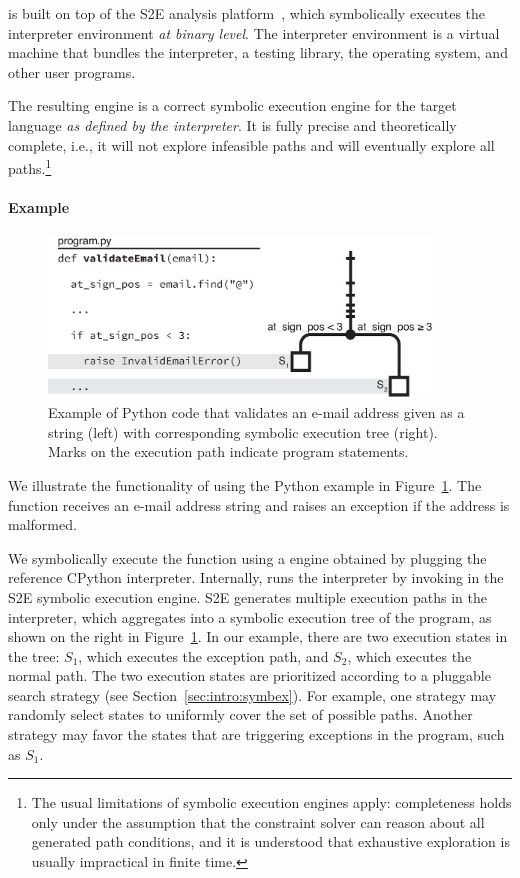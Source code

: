 \chef is built on top of the S2E analysis platform~\cite{s2eSystem}, which symbolically executes the interpreter environment \emph{at binary level}.
%
The interpreter environment is a virtual machine that bundles the interpreter, a testing library, the operating system, and other user programs.

The resulting engine is a correct symbolic execution engine for the target language \emph{as defined by the interpreter}.
%
It is fully precise and theoretically complete, i.e., it will not explore infeasible paths and will eventually explore all paths.\footnote{The usual limitations of symbolic execution engines apply: completeness holds only under the assumption that the constraint solver can reason about all generated path conditions, and it is understood that exhaustive exploration is usually impractical in finite time.}

\paragraph{Example}

\begin{figure}
  \centering
  \includegraphics[width=4in]{figures/chef/running-example}
  \caption{Example of Python code that validates an e-mail address given as a string (left) with corresponding symbolic execution tree (right).  Marks on the execution path indicate program statements.}
  \label{fig:chef:running-example}
\end{figure}

We illustrate the functionality of \chef using the Python example in Figure~\ref{fig:chef:running-example}.
%
The function  receives an e-mail address string and raises an exception if the address is malformed.

We symbolically execute the function using a \chef engine obtained by plugging the reference CPython interpreter.
%
Internally, \chef runs the interpreter by invoking  in the S2E symbolic execution engine.
%
S2E generates multiple execution paths in the interpreter, which \chef aggregates into a symbolic execution tree of the program, as shown on the right in Figure~\ref{fig:chef:running-example}.
%
In our example, there are two execution states in the tree: $S_1$, which executes the exception path, and $S_2$, which executes the normal path.
%
The two execution states are prioritized according to a pluggable search strategy (see Section~\ref{sec:intro:symbex}).  For example, one strategy may randomly select states to uniformly cover the set of possible paths.  Another strategy may favor the states that are triggering exceptions in the program, such as $S_1$.


